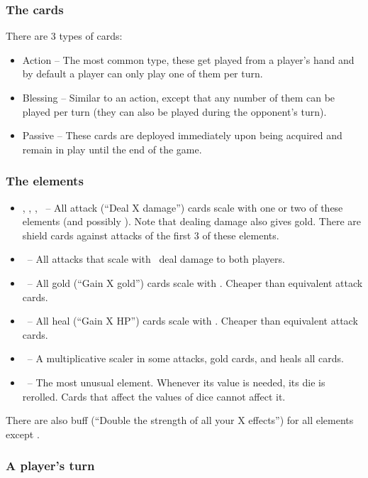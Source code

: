 \documentclass[dvipsnames,parskip,a4paper]{scrartcl}
\newcommand{\iconsize}{3.4mm}
\newcommand{\icondepth}{0.45mm}
\newcommand{\icon}[1]{\raisebox{-\icondepth}{\texttt{[image:  \#1 ]}}}
\newcommand{\fire}{\icon{icons/fire.png}}
\newcommand{\earth}{\icon{icons/earth.png}}
\newcommand{\water}{\icon{icons/water.png}}
\newcommand{\nature}{\icon{icons/nature.png}}
\newcommand{\magic}{\icon{icons/magic.png}}
\newcommand{\gold}{\icon{icons/gold.png}}
\newcommand{\chance}{\icon{icons/chance.png}}
\begin{document}
\subsubsection*{The cards}

There are 3 types of cards:

\begin{itemize}
\item Action -- The most common type, these get played from a player's hand and by default a player can only play one of them per turn.
\item Blessing -- Similar to an action, except that any number of them can be played per turn (they can also be played during the opponent's turn).
\item Passive -- These cards are deployed immediately upon being acquired and remain in play until the end of the game.
\end{itemize}

\subsubsection*{The elements}

\begin{itemize}
\item \fire, \earth, \water, \chance \ -- All attack (``Deal X damage'') cards scale with one or two of these elements (and possibly \magic). Note that dealing damage also gives gold. There are shield cards against attacks of the first 3 of these elements.
\item \water \ -- All attacks that scale with \water \ deal damage to both players.
\item \gold \ -- All gold (``Gain X gold'') cards scale with \gold. Cheaper than equivalent attack cards.
\item \nature \ -- All heal (``Gain X HP'') cards scale with \nature. Cheaper than equivalent attack cards.
\item \magic \ -- A multiplicative scaler in some attacks, gold cards, and heals all cards.
\item \chance \ -- The most unusual element. Whenever its value is needed, its die is rerolled. Cards that affect the values of dice cannot affect it.
\end{itemize}

There are also buff (``Double the strength of all your X effects'') for all elements except \chance.

\subsubsection*{A player's turn}
\end{document}
